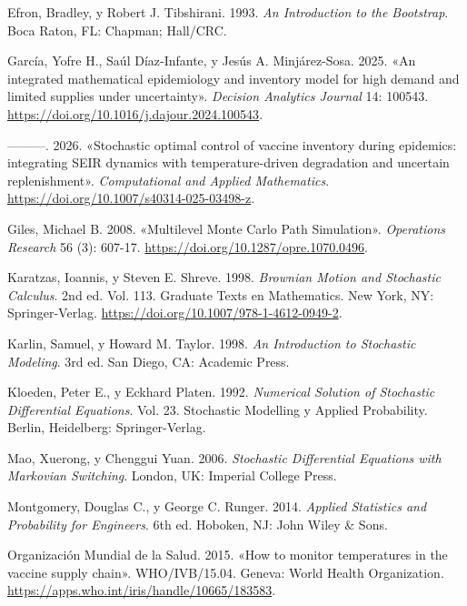 \documentclass[
  spanish,
  us-letterpaper,
]{scrreprt}
\newlength{\cslhangindent}
\newenvironment{CSLReferences}[2] %
 {\begin{list}{}{%
  \setlength{\itemindent}{0pt}
  \setlength{\leftmargin}{0pt}
  \setlength{\parsep}{0pt}
  \ifodd #1
   \setlength{\leftmargin}{\cslhangindent}
   \setlength{\itemindent}{-1\cslhangindent}
  \fi
  \setlength{\itemsep}{#2\baselineskip}}}
 {\end{list}}
\numberwithin{equation}{section}
\theoremstyle{plain}
\theoremstyle{plain}
\theoremstyle{plain}
\theoremstyle{definition}
\theoremstyle{remark}
\begin{document}
\begin{CSLReferences}{1}{0}
Efron, Bradley, y Robert J. Tibshirani. 1993. \emph{An Introduction to
the Bootstrap}. Boca Raton, FL: Chapman; Hall/CRC.

García, Yofre H., Saúl Díaz-Infante, y Jesús A. Minjárez-Sosa. 2025.
{«An integrated mathematical epidemiology and inventory model for high
demand and limited supplies under uncertainty»}. \emph{Decision
Analytics Journal} 14: 100543.
\url{https://doi.org/10.1016/j.dajour.2024.100543}.

---------. 2026. {«Stochastic optimal control of vaccine inventory
during epidemics: integrating {SEIR} dynamics with temperature-driven
degradation and uncertain replenishment»}. \emph{Computational and
Applied Mathematics}. \url{https://doi.org/10.1007/s40314-025-03498-z}.

Giles, Michael B. 2008. {«Multilevel {Monte Carlo} Path Simulation»}.
\emph{Operations Research} 56 (3): 607-17.
\url{https://doi.org/10.1287/opre.1070.0496}.

Karatzas, Ioannis, y Steven E. Shreve. 1998. \emph{Brownian Motion and
Stochastic Calculus}. 2nd ed. Vol. 113. Graduate Texts en Mathematics.
New York, NY: Springer-Verlag.
\url{https://doi.org/10.1007/978-1-4612-0949-2}.

Karlin, Samuel, y Howard M. Taylor. 1998. \emph{An Introduction to
Stochastic Modeling}. 3rd ed. San Diego, CA: Academic Press.

Kloeden, Peter E., y Eckhard Platen. 1992. \emph{Numerical Solution of
Stochastic Differential Equations}. Vol. 23. Stochastic Modelling y
Applied Probability. Berlin, Heidelberg: Springer-Verlag.

Mao, Xuerong, y Chenggui Yuan. 2006. \emph{Stochastic Differential
Equations with Markovian Switching}. London, UK: Imperial College Press.

Montgomery, Douglas C., y George C. Runger. 2014. \emph{Applied
Statistics and Probability for Engineers}. 6th ed. Hoboken, NJ: John
Wiley \& Sons.

Organización Mundial de la Salud. 2015. {«How to monitor temperatures in
the vaccine supply chain»}. WHO/IVB/15.04. Geneva: World Health
Organization. \url{https://apps.who.int/iris/handle/10665/183583}.


\end{CSLReferences}
\end{document}
